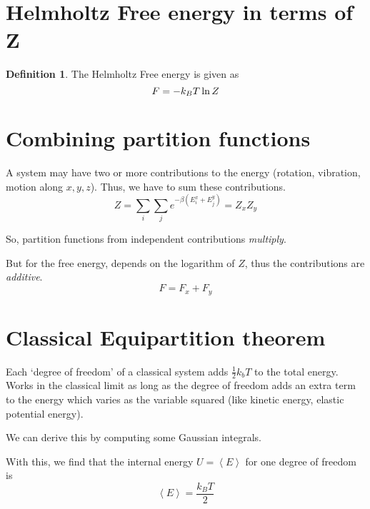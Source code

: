 \documentclass[12pt,chapterprefix=false,dvipsnames]{scrbook}
\theoremstyle{dotless}
\theoremstyle{definition}
\newtheorem{protodefinition}{Definition}[section]
\newenvironment{definition}
{\colorlet{shadecolor}{black!15}\begin{shaded}\begin{protodefinition}}
			{\end{protodefinition}\end{shaded}}
\begin{document}
\section{Helmholtz Free energy in terms of Z}%
\label{sec:helmholtz_free_energy_in_terms_of_z}

\begin{definition}
	The Helmholtz Free energy is given as
	\begin{equation}
		F = -k_B T \naturallogarithm{Z}
	\end{equation}
\end{definition}

\section{Combining partition functions}%
\label{sec:combining_partition_functions}

A system may have two or more contributions to the energy
(rotation, vibration, motion along $x,y,z$).
Thus, we have to sum these contributions.
\begin{equation}
	Z = \sum_i \sum_j e^{- \beta \left( E^x_i + E^y_j \right)} = Z_x Z_y
\end{equation}

So, partition functions from independent contributions
\textit{multiply}.

But for the free energy, depends on the logarithm of
$Z$, thus the contributions are
\textit{additive}.
\begin{equation}
	F = F_x + F_y
\end{equation}

\section{Classical Equipartition theorem}%
\label{sec:classical_equipartition_theorem}

Each `degree of freedom' of a classical system adds
$\frac{1}{2}k_b T$ to the total energy. Works in the
classical limit as long as the degree of freedom adds an extra
term to the energy which varies as the variable squared (like
kinetic energy, elastic potential energy).

We can derive this by computing some Gaussian integrals.

With this, we find that the internal energy
$U = \left<E\right>$ for one degree of freedom is
\begin{equation}
	\left<E\right>
	=
	\frac{k_B T}{2}
\end{equation}
\end{document}
